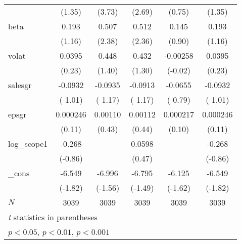 {\begin{tabular}{l*{5}{c}}
            &      (1.35)         &      (3.73)         &      (2.69)         &      (0.75)         &      (1.35)         \\
[1em]
beta        &       0.193         &       0.507\sym{*}  &       0.512\sym{*}  &       0.145         &       0.193         \\
            &      (1.16)         &      (2.38)         &      (2.36)         &      (0.90)         &      (1.16)         \\
[1em]
volat       &      0.0395         &       0.448         &       0.432         &    -0.00258         &      0.0395         \\
            &      (0.23)         &      (1.40)         &      (1.30)         &     (-0.02)         &      (0.23)         \\
[1em]
salesgr     &     -0.0932         &     -0.0935         &     -0.0913         &     -0.0655         &     -0.0932         \\
            &     (-1.01)         &     (-1.17)         &     (-1.17)         &     (-0.79)         &     (-1.01)         \\
[1em]
epsgr       &    0.000246         &     0.00110         &     0.00112         &    0.000217         &    0.000246         \\
            &      (0.11)         &      (0.43)         &      (0.44)         &      (0.10)         &      (0.11)         \\
[1em]
log\_scope1  &      -0.268         &                     &      0.0598         &                     &      -0.268         \\
            &     (-0.86)         &                     &      (0.47)         &                     &     (-0.86)         \\
[1em]
\_cons      &      -6.549         &      -6.996         &      -6.795         &      -6.125         &      -6.549         \\
            &     (-1.82)         &     (-1.56)         &     (-1.49)         &     (-1.62)         &     (-1.82)         \\
\hline
\(N\)       &        3039         &        3039         &        3039         &        3039         &        3039         \\
\hline\hline
\multicolumn{6}{l}{\footnotesize \textit{t} statistics in parentheses}\\
\multicolumn{6}{l}{\footnotesize \sym{*} \(p<0.05\), \sym{**} \(p<0.01\), \sym{***} \(p<0.001\)}\\
\end{tabular}
}
